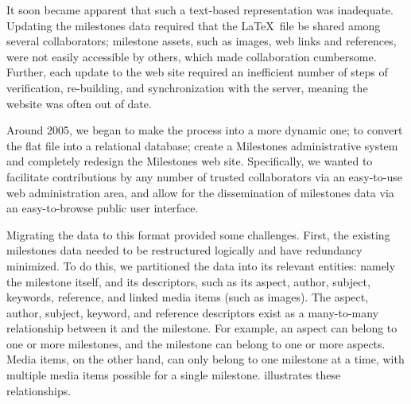 It soon became apparent that such a text-based representation was inadequate. 
Updating the milestones data required that the \LaTeX\ file be shared among 
several collaborators; milestone assets, such as images, web links and 
references, were not easily accessible by others, which made collaboration 
cumbersome. 
Further, each update to the web site required an inefficient number 
of steps of verification, re-building, and synchronization with the server, 
meaning the website was often out of date.

Around 2005, we began to make the process into a more dynamic one; to convert 
the flat file into a relational database; create a Milestones administrative 
system and completely redesign the Milestones web site. 
Specifically, we wanted 
to facilitate contributions by any number of trusted collaborators via an 
easy-to-use web administration area, and allow for the dissemination of 
milestones data via an easy-to-browse public user interface.

Migrating the data to this format provided some challenges. 
First, the existing 
milestones data needed to be restructured logically
 and have redundancy minimized. 
To do this, we partitioned the data into its relevant entities: namely the 
milestone itself, and its descriptors, such as its aspect, author, subject, 
keywords, reference, and linked media items (such as images). 
The aspect, 
author, subject, keyword, and reference descriptors exist as a many-to-many 
relationship between it and the milestone. 
For example, an aspect can belong to 
one or more milestones, and the milestone can belong to one or more aspects. 
Media items, on the other hand, can only belong to one milestone at a time, 
with multiple media items possible for a single milestone. 
 illustrates these relationships.

